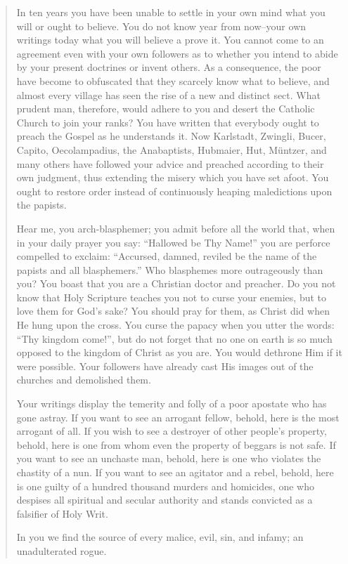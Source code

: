 \begin{quote}
In ten years you have been unable to settle in your own mind what you
will or ought to believe. You do not know year from now--your own writings
today what you will believe a prove it. You cannot come to an agreement
even with your own followers as to whether you intend to abide by
your present doctrines or invent others. As a consequence, the poor have
become to obfuscated that they scarcely know what to believe, and
almost every village has seen the rise of a new and distinct sect. What
prudent man, therefore, would adhere to you and desert the Catholic Church to
join your ranks? You have written that everybody ought to preach the
Gospel as he understands it. Now Karlstadt, Zwingli, Bucer, Capito,
Oecolampadius, the Anabaptists, Hubmaier, Hut, Müntzer, and many
others have followed your advice and preached according to their own judgment, thus
extending the misery which you have set afoot. You ought to restore order
instead of continuously heaping maledictions upon the papists.

Hear me, you arch-blasphemer; you admit before all the world that, when
in your daily prayer you say: “Hallowed be Thy Name!” you are perforce
compelled to exclaim: “Accursed, damned, reviled be the name of the papists
and all blasphemers.” Who blasphemes more outrageously than you? You
boast that you are a Christian doctor and preacher. Do you not know that
Holy Scripture teaches you not to curse your enemies, but to love them for
God’s sake? You should pray for them, as Christ did when He hung upon the
cross. You curse the papacy when you utter the words: “Thy kingdom
come!”, but do not forget that no one on earth is so much opposed to the
kingdom of Christ as you are. You would dethrone Him if it were possible.
Your followers have already cast His images out of the churches and demolished
them.

Your writings display the temerity and folly of a poor apostate who has
gone astray. If you want to see an arrogant fellow, behold, here is the most
arrogant of all. If you wish to see a destroyer of other people’s property,
behold, here is one from whom even the property of beggars is not safe. If you
want to see an unchaste man, behold, here is one who violates the chastity of
a nun. If you want to see an agitator and a rebel, behold, here is one guilty
of a hundred thousand murders and homicides, one who despises all spiritual
and secular authority and stands convicted as a falsifier of Holy Writ.

In you we find the source of every malice, evil, sin, and infamy; an unadulterated rogue.


\end{quote}
